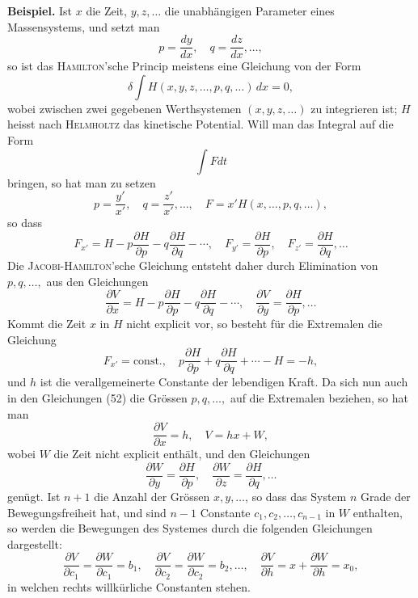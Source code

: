\documentclass[11pt,a4paper,leqno]{article}
\begin{document}
\bigskip

\noindent\textbf{Beispiel.} Ist $x$ die Zeit, $y,z,\ldots$ die unabhängigen Parameter eines Massensystems, und setzt man
\[
p=\frac{dy}{dx},\quad q=\frac{dz}{dx},\ldots,
\]
so ist das \textsc{Hamilton}'sche Princip meistens eine Gleichung von der Form
\[
\delta\int H(x,y,z,\ldots,p,q,\ldots)\,dx=0,
\]
wobei zwischen zwei gegebenen Werthsystemen $(x,y,z,\ldots)$ zu integrieren ist; $H$ heisst nach \textsc{Helmholtz} das kinetische Potential. Will man das Integral auf die Form
\[
\int Fdt
\]
bringen, so hat man zu setzen
\[
p=\frac{y'}{x'},\quad q=\frac{z'}{x'},\ldots,\quad
F=x'H(x,\ldots,p,q,\ldots),
\]
so dass
\[
F_{x'}=H-p\frac{\partial H}{\partial p}-q\frac{\partial H}{\partial q}-\cdots,\quad
F_{y'}=\frac{\partial H}{\partial p},\quad
F_{z'}=\frac{\partial H}{\partial q},\ldots
\]
Die \textsc{Jacobi-Hamilton}'sche Gleichung entsteht daher durch Elimination von $p,q,\ldots,$ aus den Gleichungen
\begin{equation}\tag{52}
\frac{\partial V}{\partial x}
=
H-p\frac{\partial H}{\partial p}
-q\frac{\partial H}{\partial q}-\cdots,\quad
\frac{\partial V}{\partial y}
=
\frac{\partial H}{\partial p},\ldots
\end{equation}
Kommt die Zeit $x$ in $H$ nicht explicit vor, so besteht für die Extremalen die Gleichung
\begin{equation}\tag{53}
F_{x'}=\text{const.},\quad
p\frac{\partial H}{\partial p}
+
q\frac{\partial H}{\partial q}
+\cdots-H=-h,
\end{equation}
und $h$ ist die verallgemeinerte Constante der lebendigen Kraft. Da sich nun auch in den Gleichungen (52) die Grössen $p,q,\ldots,$ auf die Extremalen beziehen, so hat man
\[
\frac{\partial V}{\partial x}=h,\quad V=hx+W,
\]
wobei $W$ die Zeit nicht explicit enthält, und den Gleichungen
\[
\frac{\partial W}{\partial y}
=
\frac{\partial H}{\partial p},\quad
\frac{\partial W}{\partial z}
=
\frac{\partial H}{\partial q},\ldots
\]
genügt. Ist $n+1$ die Anzahl der Grössen $x,y,\ldots$, so dass das System $n$ Grade der Bewegungsfreiheit hat, und sind $n-1$ Constante $c_1,c_2,\ldots,c_{n-1}$ in $W$ enthalten, so werden die Bewegungen des Systemes durch die folgenden Gleichungen dargestellt:
\[
\frac{\partial V}{\partial c_1}=\frac{\partial W}{\partial c_1}=b_1,\quad
\frac{\partial V}{\partial c_2}=\frac{\partial W}{\partial c_2}=b_2,\ldots,\quad
\frac{\partial V}{\partial h}=x+\frac{\partial W}{\partial h}=x_0,
\]
in welchen rechts willkürliche Constanten stehen.
\end{document}
